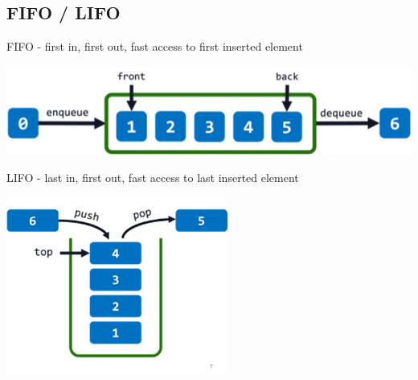 \subsection{FIFO / LIFO}
    FIFO - first in, first out, fast access to first inserted element
    {\centering \includegraphics[width = 0.8\linewidth]{src/4_data_structure/images/fifo.png} \par}
    LIFO - last in, first out, fast access to last inserted element
    {\centering \includegraphics[width = 0.5\linewidth]{src/4_data_structure/images/lifo.png} \par}